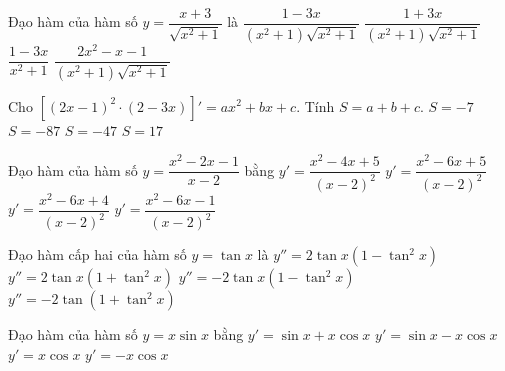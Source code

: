 \begin{ex}%
	Đạo hàm của  hàm số $y=\dfrac{x+3}{\sqrt{x^2+1}}$ là
	\choice 
		{\True  $\dfrac{1-3x}{\left(x^2+1\right)\sqrt{x^2+1}}$}
		 {$\dfrac{1+3x}{\left(x^2+1\right)\sqrt{x^2+1}}$}
		{$\dfrac{1-3x}{x^2+1}$} 
		 {$\dfrac{2x^2-x-1}{\left(x^2+1\right)\sqrt{x^2+1}}$}
\end{ex}

\begin{ex}%
	Cho $\left[(2x-1)^2\cdot(2-3x)\right]'=ax^2+bx+c$. Tính $S=a+b+c$. 
	\choice 
		 {\True $S=-7$}
		 {$S=-87$}
		 {$S=-47$}
		{$S=17$} 
\end{ex}

\begin{ex}%
	Đạo hàm của hàm số $y = \dfrac{x^2 - 2x - 1}{x - 2}$ bằng 
	\choice 
		{\True $y' = \dfrac{x^2 - 4x + 5}{(x - 2)^2}$} 
		{$y' = \dfrac{x^2 - 6x +  5}{(x - 2)^2}$}
		{$y' = \dfrac{x^2 - 6x  + 4}{(x - 2)^2}$}
		{$y' = \dfrac{x^2 -  6x - 1}{(x - 2)^2}$}
\end{ex}

\begin{ex}%
	Đạo hàm cấp hai  của hàm số $y = \tan x$ là
	\choice 
		{$y'' = 2\tan x \left(1 - \tan^2 x  \right)$}
		{\True $y'' = 2\tan x  \left(1 + \tan^2 x \right)$}
		{$y'' = - 2\tan x \left(1  - \tan^2 x \right)$}
		{$y'' = - 2\tan \left(1 + \tan^2 x \right)$} 
\end{ex}

\begin{ex}%
	Đạo hàm của hàm số $y = x\sin  x$ bằng
	 \choice
		{\True $y' = \sin x + x\cos  x$}
		{$y' = \sin x  - x\cos x$}
		 {$y' = x\cos x$}
		{$y' =  - x\cos x$}
\end{ex}


